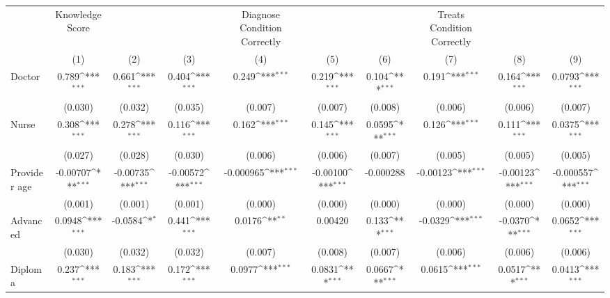 {
\def\sym#1{\ifmmode^{#1}\else\(^{#1}\)\fi}
\begin{tabular}{l*{9}{c}}
\hline\hline
                &Knowledge Score         &                  &                  &Diagnose Condition Correctly         &                  &                  &Treats Condition Correctly         &                  &                  \\
                &\multicolumn{1}{c}{(1)}         &\multicolumn{1}{c}{(2)}         &\multicolumn{1}{c}{(3)}         &\multicolumn{1}{c}{(4)}         &\multicolumn{1}{c}{(5)}         &\multicolumn{1}{c}{(6)}         &\multicolumn{1}{c}{(7)}         &\multicolumn{1}{c}{(8)}         &\multicolumn{1}{c}{(9)}         \\
\hline
Doctor          &    0.789\sym{***}&    0.661\sym{***}&    0.404\sym{***}&    0.249\sym{***}&    0.219\sym{***}&    0.104\sym{***}&    0.191\sym{***}&    0.164\sym{***}&   0.0793\sym{***}\\
                &  (0.030)         &  (0.032)         &  (0.035)         &  (0.007)         &  (0.007)         &  (0.008)         &  (0.006)         &  (0.006)         &  (0.007)         \\
Nurse           &    0.308\sym{***}&    0.278\sym{***}&    0.116\sym{***}&    0.162\sym{***}&    0.145\sym{***}&   0.0595\sym{***}&    0.126\sym{***}&    0.111\sym{***}&   0.0375\sym{***}\\
                &  (0.027)         &  (0.028)         &  (0.030)         &  (0.006)         &  (0.006)         &  (0.007)         &  (0.005)         &  (0.005)         &  (0.005)         \\
Provider age    & -0.00707\sym{***}& -0.00735\sym{***}& -0.00572\sym{***}&-0.000965\sym{***}& -0.00100\sym{***}&-0.000288         & -0.00123\sym{***}& -0.00123\sym{***}&-0.000557\sym{***}\\
                &  (0.001)         &  (0.001)         &  (0.001)         &  (0.000)         &  (0.000)         &  (0.000)         &  (0.000)         &  (0.000)         &  (0.000)         \\
Advanced        &   0.0948\sym{***}&  -0.0584\sym{*}  &    0.441\sym{***}&   0.0176\sym{**} &  0.00420         &    0.133\sym{***}&  -0.0329\sym{***}&  -0.0370\sym{***}&   0.0652\sym{***}\\
                &  (0.030)         &  (0.032)         &  (0.032)         &  (0.007)         &  (0.008)         &  (0.007)         &  (0.006)         &  (0.006)         &  (0.006)         \\
Diploma         &    0.237\sym{***}&    0.183\sym{***}&    0.172\sym{***}&   0.0977\sym{***}&   0.0831\sym{***}&   0.0667\sym{***}&   0.0615\sym{***}&   0.0517\sym{***}&   0.0413\sym{***}\\

\end{tabular}}

